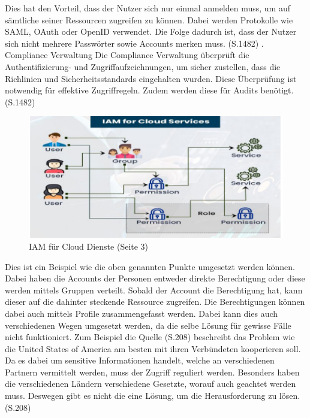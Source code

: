 Dies hat den Vorteil, dass der Nutzer sich nur einmal anmelden muss, um auf sämtliche seiner Ressourcen zugreifen zu können.
Dabei werden Protokolle wie SAML, OAuth oder OpenID verwendet.
Die Folge dadurch ist, dass der Nutzer sich nicht mehrere Passwörter sowie Accounts merken muss. \cite{IamIEEE} (S.1482)
\newline
{}. Compliance Verwaltung
\newline
Die Compliance Verwaltung überprüft die Authentifizierung- und Zugriffaufzeichnungen, um sicher zustellen, dass die Richlinien und Sicherheitsstandards eingehalten wurden.
Diese Überprüfung ist notwendig für effektive Zugriffregeln.
Zudem werden diese für Audits benötigt. \cite{IamIEEE} (S.1482)
\newline
\newline
\begin{figure}[h!]
 \centering
 \includegraphics[width=1\textwidth]{gfx/Picture/IAMISH.PNG}
 \caption{IAM für Cloud Dienste \cite{Moha19} (Seite 3)}
 \label{fig:IMAISH}
\end{figure}
Dies ist ein Beispiel wie die oben genannten Punkte umgesetzt werden können.
Dabei haben die Accounts der Personen entweder direkte Berechtigung oder diese werden mittels Gruppen verteilt.
Sobald der Account die Berechtigung hat, kann dieser auf die dahinter steckende Ressource zugreifen.
Die Berechtigungen können dabei auch mittels Profile zusammengefasst werden.
\newline
Dabei kann dies auch verschiedenen Wegen umgesetzt werden, da die selbe Lösung für gewisse Fälle nicht funktioniert.
Zum Beispiel die Quelle \cite{Cal17}(S.208) beschreibt das Problem wie die United States of America am besten mit ihren Verbündeten kooperieren soll.
Da es dabei um sensitive Informationen handelt, welche an verschiedenen Partnern vermittelt werden, muss der Zugriff reguliert werden.
Besonders haben die verschiedenen Ländern verschiedene Gesetzte, worauf auch geachtet werden muss. 
Deswegen gibt es nicht die eine Lösung, um die Herausforderung zu lösen. \cite{Cal17} (S.208)



